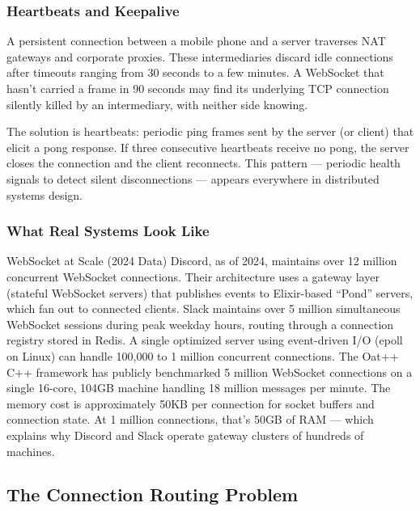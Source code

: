 \documentclass[11pt,a4paper]{article}
\begin{document}
\subsubsection{Heartbeats and Keepalive}

A persistent connection between a mobile phone and a server traverses NAT gateways and corporate proxies. These intermediaries discard idle connections after timeouts ranging from 30 seconds to a few minutes. A WebSocket that hasn't carried a frame in 90 seconds may find its underlying TCP connection silently killed by an intermediary, with neither side knowing.

The solution is heartbeats: periodic ping frames sent by the server (or client) that elicit a pong response. If three consecutive heartbeats receive no pong, the server closes the connection and the client reconnects. This pattern --- periodic health signals to detect silent disconnections --- appears everywhere in distributed systems design.

\subsubsection{What Real Systems Look Like}

\begin{industrybox}{WebSocket at Scale (2024 Data)}
Discord, as of 2024, maintains over 12 million concurrent WebSocket connections. Their architecture uses a gateway layer (stateful WebSocket servers) that publishes events to Elixir-based ``Pond'' servers, which fan out to connected clients. Slack maintains over 5 million simultaneous WebSocket sessions during peak weekday hours, routing through a connection registry stored in Redis. A single optimized server using event-driven I/O (epoll on Linux) can handle 100,000 to 1 million concurrent connections. The Oat++ C++ framework has publicly benchmarked 5 million WebSocket connections on a single 16-core, 104GB machine handling 18 million messages per minute. The memory cost is approximately 50KB per connection for socket buffers and connection state. At 1 million connections, that's 50GB of RAM --- which explains why Discord and Slack operate gateway clusters of hundreds of machines.
\end{industrybox}

\subsection{The Connection Routing Problem}
\end{document}
